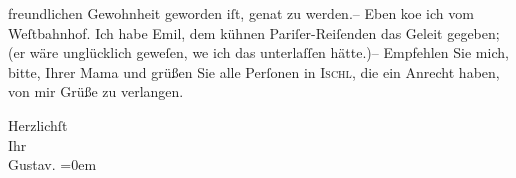                freundlichen Gewohnheit geworden iſt, gena{\geminationn}t zu werden.–
               Eben ko{\geminationm}e ich vom Weſtbahnhof. Ich habe Emil, dem kühnen Pariſer-Reiſenden das Geleit gegeben; (er wäre
               unglücklich geweſen, we{\geminationn} ich das unterlaſſen hätte.)–
                  {\pb}Empfehlen Sie mich, bitte, Ihrer
                  Mama und grüßen Sie alle
               Perſonen in \textsc{Ischl}, die ein Anrecht haben, von mir Grüße zu verlangen.\pend
           
\pstart
           Herzlichſt{\\[\baselineskip]}Ihr{\\[\baselineskip]}\spacefill\mbox{Gustav.}\pend
           \leftskip=0em{}\endnumbering{}
\begin{anhang}
\end{anhang}\newcommand{\dateiname}{L04302}\newcommand{\titel}{Gustav Schwarzkopf an Arthur Schnitzler, 4. 8. 1900}\newcommand{\editorInnen}{Herausgegeben von Jahnke, SelmaMüller, Martin Anton}

